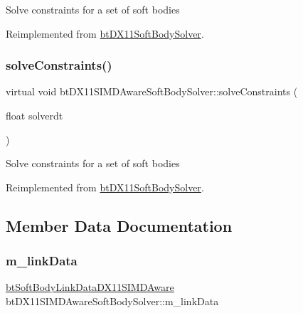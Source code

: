 Solve constraints for a set of soft bodies 

Reimplemented from \hyperlink{classbtDX11SoftBodySolver_ab6477819156cdc0f5850514683b77f08}{bt\+D\+X11\+Soft\+Body\+Solver}.

\mbox{\label{classbtDX11SIMDAwareSoftBodySolver_a952ce0e7cf089b1eee2db1f75319ec27}} 
\subsubsection{\texorpdfstring{solve\+Constraints()}{solveConstraints()}\hspace{0.1cm}{\footnotesize\ttfamily [2/2]}}
{\footnotesize\ttfamily virtual void bt\+D\+X11\+S\+I\+M\+D\+Aware\+Soft\+Body\+Solver\+::solve\+Constraints (\begin{DoxyParamCaption}\item[{float}]{solverdt }\end{DoxyParamCaption})\hspace{0.3cm}{\ttfamily [virtual]}}

Solve constraints for a set of soft bodies 

Reimplemented from \hyperlink{classbtDX11SoftBodySolver_ab6477819156cdc0f5850514683b77f08}{bt\+D\+X11\+Soft\+Body\+Solver}.



\subsection{Member Data Documentation}
\mbox{\label{classbtDX11SIMDAwareSoftBodySolver_a49c86a3bbaf2e70877057fa0d2059848}} 
\subsubsection{\texorpdfstring{m\+\_\+link\+Data}{m\_linkData}}
{\footnotesize\ttfamily \hyperlink{classbtSoftBodyLinkDataDX11SIMDAware}{bt\+Soft\+Body\+Link\+Data\+D\+X11\+S\+I\+M\+D\+Aware} bt\+D\+X11\+S\+I\+M\+D\+Aware\+Soft\+Body\+Solver\+::m\+\_\+link\+Data\hspace{0.3cm}{\ttfamily [protected]}}

